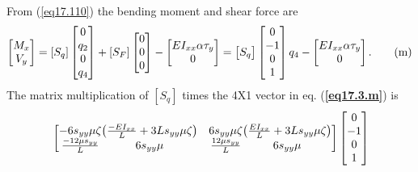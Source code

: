 \documentclass{AeroStructure-ERJohnson}
\begin{document}
\begin{example}
\begin{equation}
\end{equation}
From (\ref{eq17.110}) the bending moment and shear force are
\begin{equation}
\left[\begin{array}{@{}c@{}}M_{x} \\V_{y}\end{array}\right]=\left[S_{q}\right]\left[\begin{array}{@{}c@{}}0 \\q_{2} \\0 \\q_{4}\end{array}\right]+\left[S_{F}\right]\left[\begin{array}{@{}l@{}}0 \\0 \\0\end{array}\right]-\left[\begin{array}{@{}c@{}}E I_{x x} \alpha \tau_{y} \\0\end{array}\right]=\left[\begin{array}{@{}c@{}}S_{q}\end{array}\right]\left[\begin{array}{@{}c@{}}0 \\-1 \\0 \\1\end{array}\right] q_{4}-\left[\begin{array}{@{}c@{}}E I_{x x} \alpha \tau_{y} \\0\end{array}\right]. \label{eq17.3.m}\tag{m}
\end{equation}
The matrix multiplication of $\left[S_{q}\right]$ times the 4X1 vector in eq. (\textbf{\ref{eq17.3.m}}) is
\begin{align}
&\left[\begin{array}{@{}c@{}cc@{}c@{}}
-6 s_{y y}\mu\zeta & \left(\frac{-E I_{x x}}{L}+3 L s_{y y} \mu \zeta\right) & 6 s_{y y}\mu\zeta &\left(\frac{E I_{x x}}{L}+3 L s_{y y} \mu \zeta\right) \\
\frac{-12\mu s_{y y}}{L} & 6 s_{y y}\mu & \frac{12\mu s_{y y}}{L} & 6 s_{y y}\mu
\end{array}\right] \left[\begin{array}{@{}c@{}}0 \\-1 \\0 \\1\end{array}\right]  \nonumber\\

\end{align}
\end{example}
\end{document}
